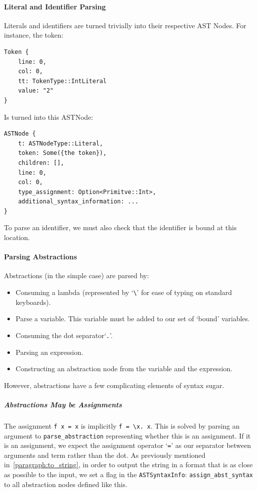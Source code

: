 \paragraph{Literal and Identifier Parsing}
Literals and identifiers are turned trivially into their respective AST Nodes. For instance, the token:
\begin{lstlisting}[language=Rust_boxed]
Token {
    line: 0,
    col: 0,
    tt: TokenType::IntLiteral
    value: "2"
}
\end{lstlisting}
Is turned into this ASTNode:
\begin{lstlisting}[language=Rust_boxed]
ASTNode {
    t: ASTNodeType::Literal,
    token: Some({the token}),
    children: [],
    line: 0,
    col: 0,
    type_assignment: Option<Primitve::Int>,
    additional_syntax_information: ...
}
\end{lstlisting}

\noindent To parse an identifier, we must also check that the identifier is bound at this location.

\paragraph{Parsing Abstractions}
Abstractions (in the simple case) are parsed by:
\begin{itemize}
    \item Consuming a lambda (represented by `\verb|\|' for ease of typing on standard keyboards).
    \item Parse a variable. This variable must be added to our set of `bound' variables.
    \item Consuming the dot separator`\verb|.|'.
    \item Parsing an expression.
    \item Constructing an abstraction node from the variable and the expression.
\end{itemize}

\noindent However, abstractions have a few complicating elements of syntax sugar.

\subparagraph{Abstractions May be Assignments}
The assignment \verb|f x = x| is implicitly \verb|f = \x. x|. This is solved by parsing an argument to \verb|parse_abstraction| representing whether this is an assignment. If it is an assignment, we expect the assignment operator `\verb|=|' as our separator between arguments and term rather than the dot. As previously mentioned in~\ref{paragraph:to_string}, in order to output the string in a format that is as close as possible to the input, we set a flag in the \verb|ASTSyntaxInfo|: \verb|assign_abst_syntax| to all abstraction nodes defined like this. 

